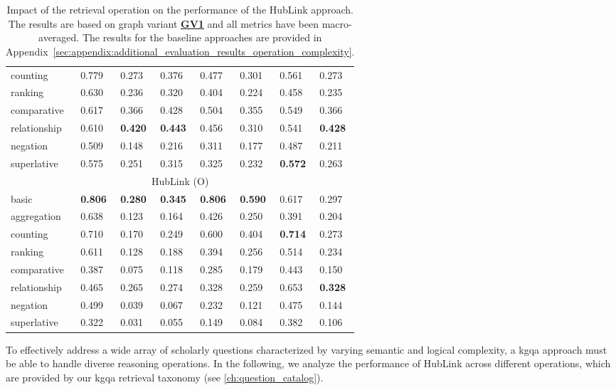 \begin{table}[hp]
{\begin{tabular}{@{}llllllll@{}}
counting & 0.779 & 0.273 & 0.376 & 0.477 & 0.301 & 0.561 & 0.273 \\
ranking & 0.630 & 0.236 & 0.320 & 0.404 & 0.224 & 0.458 & 0.235 \\
comparative & 0.617 & 0.366 & 0.428 & 0.504 & 0.355 & 0.549 & 0.366 \\
relationship & 0.610 & \textbf{0.420} & \textbf{0.443} & 0.456 & 0.310 & 0.541 & \textbf{0.428} \\
negation & 0.509 & 0.148 & 0.216 & 0.311 & 0.177 & 0.487 & 0.211 \\
superlative & 0.575 & 0.251 & 0.315 & 0.325 & 0.232 & \textbf{0.572} & 0.263 \\
\midrule
\multicolumn{8}{c}{HubLink (O)} \\
\midrule
basic & \textbf{0.806} & \textbf{0.280} & \textbf{0.345} & \textbf{0.806} & \textbf{0.590} & 0.617 & 0.297 \\
aggregation & 0.638 & 0.123 & 0.164 & 0.426 & 0.250 & 0.391 & 0.204 \\
counting & 0.710 & 0.170 & 0.249 & 0.600 & 0.404 & \textbf{0.714} & 0.273 \\
ranking & 0.611 & 0.128 & 0.188 & 0.394 & 0.256 & 0.514 & 0.234 \\
comparative & 0.387 & 0.075 & 0.118 & 0.285 & 0.179 & 0.443 & 0.150 \\
relationship & 0.465 & 0.265 & 0.274 & 0.328 & 0.259 & 0.653 & \textbf{0.328} \\
negation & 0.499 & 0.039 & 0.067 & 0.232 & 0.121 & 0.475 & 0.144 \\
superlative & 0.322 & 0.031 & 0.055 & 0.149 & 0.084 & 0.382 & 0.106 \\
\bottomrule
\end{tabular}%
}
\caption[HubLink Performance by Operation Complexity]{Impact of the retrieval operation on the performance of the HubLink approach. The results are based on graph variant \hyperref[enum:gv1]{\textbf{GV1}} and all metrics have been macro-averaged. The results for the baseline approaches are provided in Appendix~\ref{sec:appendix:additional_evaluation_results_operation_complexity}.}
\label{tab:q12:retrieval_operation}
\end{table}

To effectively address a wide array of scholarly questions characterized by varying semantic and logical complexity, a \gls{kgqa} approach must be able to handle diverse reasoning operations. In the following, we analyze the performance of HubLink across different operations, which are provided by our \gls{kgqa} retrieval taxonomy (see \autoref{ch:question_catalog}). 

